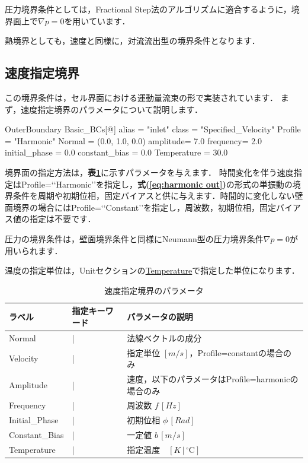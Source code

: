 圧力境界条件としては，Fractional Step法のアルゴリズムに適合するように，境界面上で$\nabla p=0$を用いています．

熱境界としても，速度と同様に，対流流出型の境界条件となります．



\pagebreak
\subsection{速度指定境界}

この境界条件は，セル界面における運動量流束の形で実装されています．
まず，速度指定境界のパラメータについて説明します．

{\small
\begin{program}
OuterBoundary {
  Basic_BCs[@] {
    alias    = "inlet"
    class    = "Specified_Velocity"
    Profile  = "Harmonic"
    Normal   = (0.0, 1.0, 0.0)
    amplitude= 7.0
    frequency= 2.0
    initial_phase = 0.0
    constant_bias = 0.0
    Temperature = 30.0
  }
}
\end{program}
}

\noindent 境界面の指定方法は，\textbf{表\ref{tbl:vspec parameter with heat}}に示すパラメータを与えます．
時間変化を伴う速度指定はProfile=\lq\lq Harmonic\rq\rq を指定し，\textbf{式(\ref{eq:harmonic out})}の形式の単振動の境界条件を周期や初期位相，固定バイアスと供に与えます．時間的に変化しない壁面境界の場合にはProfile=\lq\lq Constant\rq\rq を指定し，周波数，初期位相，固定バイアス値の指定は不要です．

圧力の境界条件は，壁面境界条件と同様にNeumann型の圧力境界条件$\nabla p=0$が用いられます．

温度の指定単位は，Unitセクションの\hyperlink{tgt:unit}{Temperature}で指定した単位になります．

\begin{table}[htdp]
\caption{速度指定境界のパラメータ}
\begin{center}
\small
\begin{tabular}{lll} \toprule
ラベル & 指定キーワード & パラメータの説明\\ \midrule
Normal & | & 法線ベクトルの成分\\
Velocity & | & 指定単位 $[m/s]$，Profile=constantの場合のみ\\
Amplitude & | & 速度，以下のパラメータはProfile=harmonicの場合のみ\\
Frequency & | & 周波数 $f\, [Hz]$\\
Initial\_Phase & | & 初期位相 $\phi\, [Rad]$\\
Constant\_Bias & | & 一定値 $b\, [m/s]$\\
Temperature & | & 指定温度　$[K\,|\,{}^\circ\mathrm{C}]$\\
\bottomrule
\end{tabular}
\end{center}
\label{tbl:vspec parameter with heat}
\end{table}


